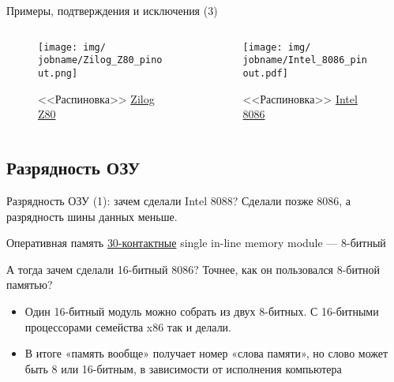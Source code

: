 \documentclass[xetex,aspectratio=43]{beamer}
\begin{document}
\begin{frame}{Примеры, подтверждения и исключения (3)}

\begin{columns}
    \begin{column}{0.5\textwidth}
        \begin{figure}
            \texttt{[image: img/\\jobname/Zilog\_Z80\_pinout.png]}
            \caption{<<Распиновка>> \href{https://en.wikipedia.org/wiki/Zilog_Z80}{Zilog Z80}}
        \end{figure}
    \end{column}
    \begin{column}{0.5\textwidth}
        \begin{figure}
            \texttt{[image: img/\\jobname/Intel\_8086\_pinout.pdf]}
            \caption{<<Распиновка>> \href{https://en.wikipedia.org/wiki/Intel_8086}{Intel 8086}}
        \end{figure}
    \end{column}
\end{columns}

\end{frame}

\subsection{Разрядность ОЗУ}

\begin{frame}{Разрядность ОЗУ (1): зачем сделали Intel 8088?}
Сделали позже 8086, а разрядность шины данных меньше.

\pause

Оперативная память
\href{https://en.wikipedia.org/wiki/SIMM\#30-pin_SIMMs}{30-контактные} single in-line memory module --- 8-битный

А тогда зачем сделали 16-битный 8086? Точнее, как он пользовался 8-битной памятью?

\pause

\begin{itemize}
    \item
    Один 16-битный модуль можно собрать из двух 8-битных. С 16-битными
    процессорами семейства x86 так и делали.
    \item
    В итоге «память вообще» получает номер «слова памяти», но слово может
    быть 8 или 16-битным, в зависимости от исполнения компьютера
\end{itemize}
\end{frame}
\end{document}
